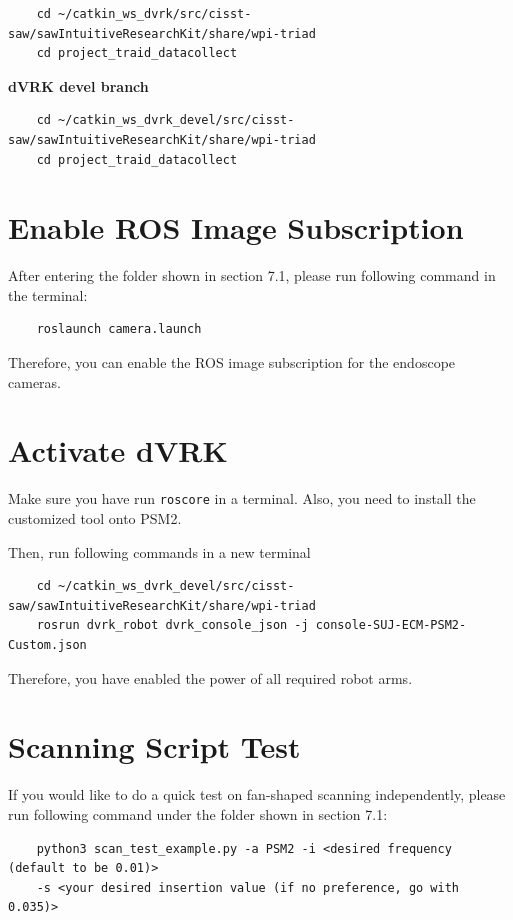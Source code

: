 \begin{verbatim}
    cd ~/catkin_ws_dvrk/src/cisst-saw/sawIntuitiveResearchKit/share/wpi-triad
    cd project_traid_datacollect
\end{verbatim}

\textbf{dVRK devel branch}

\begin{verbatim}
    cd ~/catkin_ws_dvrk_devel/src/cisst-saw/sawIntuitiveResearchKit/share/wpi-triad
    cd project_traid_datacollect
\end{verbatim}

\section{Enable ROS Image Subscription}

After entering the folder shown in section 7.1, please run following command in the terminal:

\begin{verbatim}
    roslaunch camera.launch
\end{verbatim}

Therefore, you can enable the ROS image subscription for the endoscope cameras.

\section{Activate dVRK}

Make sure you have run \texttt{roscore} in a terminal. Also, you need to install the customized tool onto PSM2.

Then, run following commands in a new terminal

\begin{verbatim}
    cd ~/catkin_ws_dvrk_devel/src/cisst-saw/sawIntuitiveResearchKit/share/wpi-triad
    rosrun dvrk_robot dvrk_console_json -j console-SUJ-ECM-PSM2-Custom.json
\end{verbatim}

Therefore, you have enabled the power of all required robot arms.

\section{Scanning Script Test}

If you would like to do a quick test on fan-shaped scanning independently, please run following command under the folder shown in section 7.1:

\begin{verbatim}
    python3 scan_test_example.py -a PSM2 -i <desired frequency (default to be 0.01)>
    -s <your desired insertion value (if no preference, go with 0.035)>
\end{verbatim}

